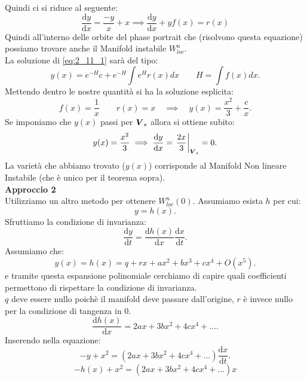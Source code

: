 \begin{exmp}[]
    Quindi ci si riduce al seguente:
    \begin{equation}
	\frac{\text{d} y}{\text{d} x} = \frac{-y}{x} + x \implies  \frac{\text{d} y}{\text{d} x}  + y f(x) = r(x) 
	\label{eq:2_11_1}
    \end{equation}
    Quindi all'interno delle orbite del phase portrait che (risolvono questa equazione) possiamo trovare anche il Manifold instabile $W_{loc}^u$.\\
    La soluzione di \ref{eq:2_11_1} sarà del tipo:
    \[
	y(x) = e^{-H}c + e^{-H}\int e^Hr(x) dx \qquad  H = \int f(x) dx
    .\] 
    Mettendo dentro le nostre quantità si ha la soluzione esplicita:
    \[
	f(x) = \frac{1}{x} \qquad  r(x) = x \quad\implies\quad  y(x) = \frac{x^2}{3} + \frac{c}{x}
    .\] 
    Se imponiamo che $y(x)$ passi per $\boldsymbol{V}_s$ allora si ottiene subito:
    \[
	y(x) = \frac{x^2}{3} \implies  \frac{\text{d} y}{\text{d} x} =\left.\frac{2x}{3}\right|_{\boldsymbol{V}_s} = 0
    .\] 
    La varietà che abbiamo trovato ($y(x)$) corrisponde al Manifold Non lineare Instabile (che è unico per il teorema sopra).\\
    \textbf{Approccio 2}\\
    Utilizziamo un altro metodo per ottenere $W_{loc}^u(0)$. Assumiamo esista $h$ per cui:
    \[
	y = h(x) 
    .\] 
    Sfruttiamo la condizione di invarianza:
    \[
	\frac{\text{d} y}{\text{d} t} = \frac{\text{d} h(x) }{\text{d} x} \frac{\text{d} x}{\text{d} t} 
    .\] 
    Assumiamo che:
    \[
	y(x) = h(x) = q + rx + ax^2 + bx^3 + cx^4 + O(x^5) 
    .\] 
    e tramite questa espansione polinomiale cerchiamo di capire quali coefficienti permettono di rispettare la condizione di invarianza.\\
    $ q$ deve essere nullo poichè il manifold deve passare dall'origine, $r$ è invece nullo per la condizione di tangenza in $0$.
    \[
	\frac{\text{d} h(x) }{\text{d} x} = 2ax + 3bx^2+ 4cx^4 + \ldots
    .\] 
    Inserendo nella equazione:
    \[
	-y + x^2 = (2ax + 3bx^2+ 4cx^4 + \ldots)\frac{\text{d} x}{\text{d} t}
    .\] 
    \[
	-h(x) + x^2 = (2ax + 3bx^2+ 4cx^4 + \ldots)x
\]
\end{exmp}
